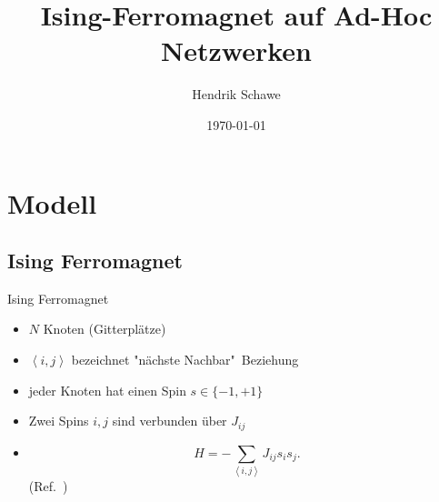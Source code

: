 \documentclass{beamer}
\title{Ising-Ferromagnet auf Ad-Hoc Netzwerken}
\author{Hendrik Schawe}
\date{\today}
\newcommand{\avg}[1]{\left< #1 \right>}
\begin{document}
\maketitle
\frame{\tableofcontents[pausesections]}

\section{Modell}
    \subsection{Ising Ferromagnet}
        \begin{frame}{Ising Ferromagnet}
            \begin{itemize}[<+->]
                \item \(N\) Knoten (Gitterplätze)
                \item \(\avg{i,j}\) bezeichnet "nächste Nachbar"\ Beziehung
                \item jeder Knoten hat einen Spin \(s \in \{-1,+1\}\){}
                \item Zwei Spins \(i,j\) sind verbunden über \(J_{ij}\)
                \item{
                    \begin{equation}
                        H = - \sum_{\avg{i,j}}J_{ij}s_{i}s_{j}.
                    \end{equation}
                    (Ref.\ \cite{Ising1925})
                }
            \end{itemize}
        \end{frame}
\end{document}

